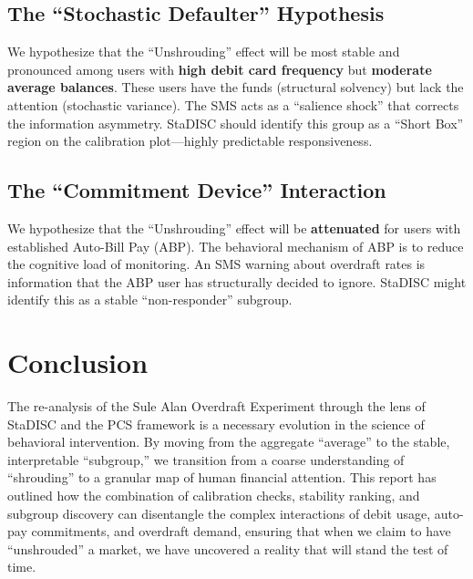 \documentclass[11pt,a4paper]{article}
\begin{document}
	\subsection{The ``Stochastic Defaulter'' Hypothesis}
	We hypothesize that the ``Unshrouding'' effect will be most stable and pronounced among users with \textbf{high debit card frequency} but \textbf{moderate average balances}. These users have the funds (structural solvency) but lack the attention (stochastic variance). The SMS acts as a ``salience shock'' that corrects the information asymmetry. StaDISC should identify this group as a ``Short Box'' region on the calibration plot---highly predictable responsiveness.
	
	\subsection{The ``Commitment Device'' Interaction}
	We hypothesize that the ``Unshrouding'' effect will be \textbf{attenuated} for users with established Auto-Bill Pay (ABP). The behavioral mechanism of ABP is to reduce the cognitive load of monitoring. An SMS warning about overdraft rates is information that the ABP user has structurally decided to ignore. StaDISC might identify this as a stable ``non-responder'' subgroup.
	
	\section{Conclusion}
	The re-analysis of the Sule Alan Overdraft Experiment through the lens of StaDISC and the PCS framework is a necessary evolution in the science of behavioral intervention. By moving from the aggregate ``average'' to the stable, interpretable ``subgroup,'' we transition from a coarse understanding of ``shrouding'' to a granular map of human financial attention. This report has outlined how the combination of calibration checks, stability ranking, and subgroup discovery can disentangle the complex interactions of debit usage, auto-pay commitments, and overdraft demand, ensuring that when we claim to have ``unshrouded'' a market, we have uncovered a reality that will stand the test of time.
	
	
	
	
\end{document}
